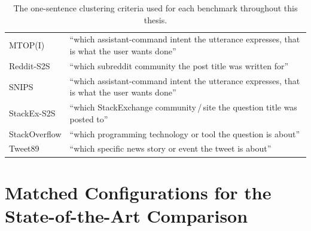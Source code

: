 \documentclass[11pt,a4paper,oneside]{report}
\begin{document}
\begin{table}[htbp]
\begin{tabularx}{\textwidth}{@{}lX@{}}
MTOP(I)       & ``which assistant-command intent the utterance expresses, that is what the user wants done'' \\
Reddit-S2S    & ``which subreddit community the post title was written for'' \\
SNIPS         & ``which assistant-command intent the utterance expresses, that is what the user wants done'' \\
StackEx-S2S   & ``which StackExchange community\,/\,site the question title was posted to'' \\
StackOverflow & ``which programming technology or tool the question is about'' \\
Tweet89       & ``which specific news story or event the tweet is about'' \\
\bottomrule
\end{tabularx}
\caption[Criterion sentences per benchmark]{The one-sentence clustering criteria used for each benchmark throughout this thesis.}
\label{tab:criteria}
\end{table}



\FloatBarrier

\section{Matched Configurations for the State-of-the-Art Comparison}\label{app:stacks}
\end{document}
